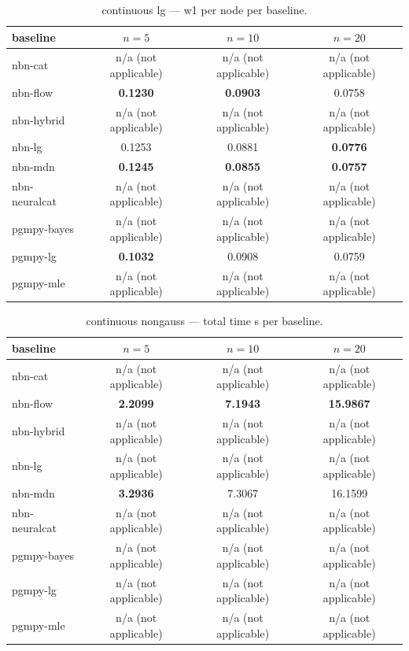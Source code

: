 \begin{table}[h]
\centering
\caption{continuous lg — w1 per node per baseline.}
\label{tab:continuous_lg_w1_per_node}
\begin{tabular}{lccc}
\toprule
baseline & $n=5$ & $n=10$ & $n=20$ \\
\midrule
nbn-cat & n/a (not applicable) & n/a (not applicable) & n/a (not applicable) \\
nbn-flow & \textbf{0.1230} & \textbf{0.0903} & 0.0758 \\
nbn-hybrid & n/a (not applicable) & n/a (not applicable) & n/a (not applicable) \\
nbn-lg & 0.1253 & 0.0881 & \textbf{0.0776} \\
nbn-mdn & \textbf{0.1245} & \textbf{0.0855} & \textbf{0.0757} \\
nbn-neuralcat & n/a (not applicable) & n/a (not applicable) & n/a (not applicable) \\
pgmpy-bayes & n/a (not applicable) & n/a (not applicable) & n/a (not applicable) \\
pgmpy-lg & \textbf{0.1032} & 0.0908 & 0.0759 \\
pgmpy-mle & n/a (not applicable) & n/a (not applicable) & n/a (not applicable) \\
\bottomrule
\end{tabular}
\end{table}

\begin{table}[h]
\centering
\caption{continuous nongauss — total time s per baseline.}
\label{tab:continuous_nongauss_total_time_s}
\begin{tabular}{lccc}
\toprule
baseline & $n=5$ & $n=10$ & $n=20$ \\
\midrule
nbn-cat & n/a (not applicable) & n/a (not applicable) & n/a (not applicable) \\
nbn-flow & \textbf{2.2099} & \textbf{7.1943} & \textbf{15.9867} \\
nbn-hybrid & n/a (not applicable) & n/a (not applicable) & n/a (not applicable) \\
nbn-lg & n/a (not applicable) & n/a (not applicable) & n/a (not applicable) \\
nbn-mdn & \textbf{3.2936} & 7.3067 & 16.1599 \\
nbn-neuralcat & n/a (not applicable) & n/a (not applicable) & n/a (not applicable) \\
pgmpy-bayes & n/a (not applicable) & n/a (not applicable) & n/a (not applicable) \\
pgmpy-lg & n/a (not applicable) & n/a (not applicable) & n/a (not applicable) \\
pgmpy-mle & n/a (not applicable) & n/a (not applicable) & n/a (not applicable) \\
\bottomrule
\end{tabular}
\end{table}

